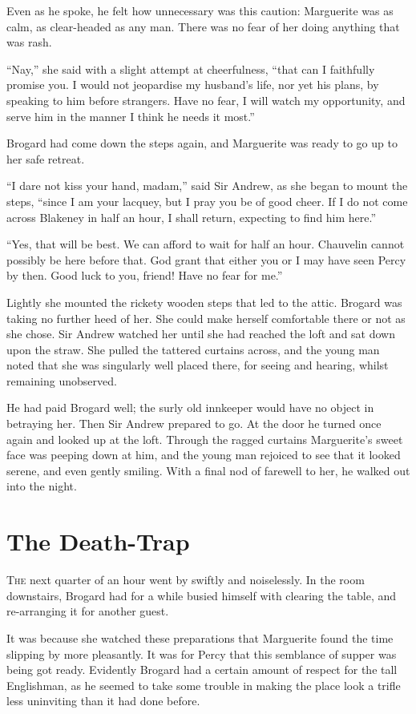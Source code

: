 \documentclass[paper=5.5in:8.5in,BCOR=7mm,twoside,DIV=calc,12pt,usegeometry,chapterprefix,endperiod,headings=big]{scrbook}
\begin{document}
Even as he spoke, he felt how unnecessary was this caution: Marguerite was as calm, as clear-headed as any man. There was no fear of her doing anything that was rash.

\enquote{Nay,} she said with a slight attempt at cheerfulness, \enquote{that can I faithfully promise you. I would not jeopardise my husband's life, nor yet his plans, by speaking to him before strangers. Have no fear, I will watch my opportunity, and serve him in the manner I think he needs it most.}

Brogard had come down the steps again, and Marguerite was ready to go up to her safe retreat.

\enquote{I dare not kiss your hand, madam,} said Sir Andrew, as she began to mount the steps, \enquote{since I am your lacquey, but I pray you be of good cheer. If I do not come across Blakeney in half an hour, I shall return, expecting to find him here.}

\enquote{Yes, that will be best. We can afford to wait for half an hour. Chauvelin cannot possibly be here before that. God grant that either you or I may have seen Percy by then. Good luck to you, friend! Have no fear for me.}

Lightly she mounted the rickety wooden steps that led to the attic. Brogard was taking no further heed of her. She could make herself comfortable there or not as she chose. Sir Andrew watched her until she had reached the loft and sat down upon the straw. She pulled the tattered curtains across, and the young man noted that she was singularly well placed there, for seeing and hearing, whilst remaining unobserved.

He had paid Brogard well; the surly old innkeeper would have no object in betraying her. Then Sir Andrew prepared to go. At the door he turned once again and looked up at the loft. Through the ragged curtains Marguerite's sweet face was peeping down at him, and the young man rejoiced to see that it looked serene, and even gently smiling. With a final nod of farewell to her, he walked out into the night.

\chapter{The Death-Trap}
\lettrine[lines=4]{T}{he} next quarter of an hour went by swiftly and noiselessly. In the room downstairs, Brogard had for a while busied himself with clearing the table, and re-arranging it for another guest.

It was because she watched these preparations that Marguerite found the time slipping by more pleasantly. It was for Percy that this semblance of supper was being got ready. Evidently Brogard had a certain amount of respect for the tall Englishman, as he seemed to take some trouble in making the place look a trifle less uninviting than it had done before.
\end{document}
